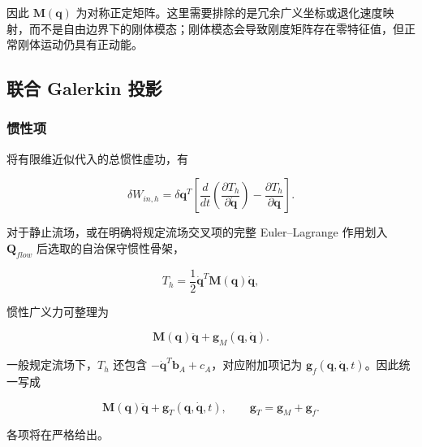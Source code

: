 因此 \(\mathbf{M}\left( \mathbf{q} \right)\) 为对称正定矩阵。这里需要排除的是冗余广义坐标或退化速度映射，而不是自由边界下的刚体模态；刚体模态会导致刚度矩阵存在零特征值，但正常刚体运动仍具有正动能。

\subsection{联合 Galerkin 投影}\label{sec:galerkin-2-5}

\subsubsection{惯性项}\label{sec:galerkin-2-5-1}

将有限维近似代入的总惯性虚功，有

\begin{equation}
\label{eq:galerkin-2-65}
\delta W_{in,h} = \delta\mathbf{q}^{T}\left\lbrack \frac{d}{dt}\left( \frac{\partial T_{h}}{\partial\dot{\mathbf{q}}} \right) - \frac{\partial T_{h}}{\partial\mathbf{q}} \right\rbrack.
\end{equation}

对于静止流场，或在明确将规定流场交叉项的完整 Euler--Lagrange 作用划入 \(\mathbf{Q}_{flow}\) 后选取的自治保守惯性骨架，

\begin{equation}
\label{eq:galerkin-2-66}
T_{h} = \frac{1}{2}{\dot{\mathbf{q}}}^{T}\mathbf{M}\left( \mathbf{q} \right)\dot{\mathbf{q}},
\end{equation}

惯性广义力可整理为

\begin{equation}
\label{eq:galerkin-2-67}
\mathbf{M}\left( \mathbf{q} \right)\ddot{\mathbf{q}} + \mathbf{g}_{M}\left( \mathbf{q},\dot{\mathbf{q}} \right).
\end{equation}

一般规定流场下，\(T_{h}\) 还包含 \(- {\dot{\mathbf{q}}}^{T}\mathbf{b}_{A} + c_{A}\)，对应附加项记为 \(\mathbf{g}_{f}\left( \mathbf{q},\dot{\mathbf{q}},t \right)\)。因此统一写成

\begin{equation}
\label{eq:galerkin-2-68}
\boxed{\mathbf{M}\left( \mathbf{q} \right)\ddot{\mathbf{q}} + \mathbf{g}_{T}\left( \mathbf{q},\dot{\mathbf{q}},t \right),\quad\quad\mathbf{g}_{T} = \mathbf{g}_{M} + \mathbf{g}_{f}.}
\end{equation}

各项将在严格给出。

